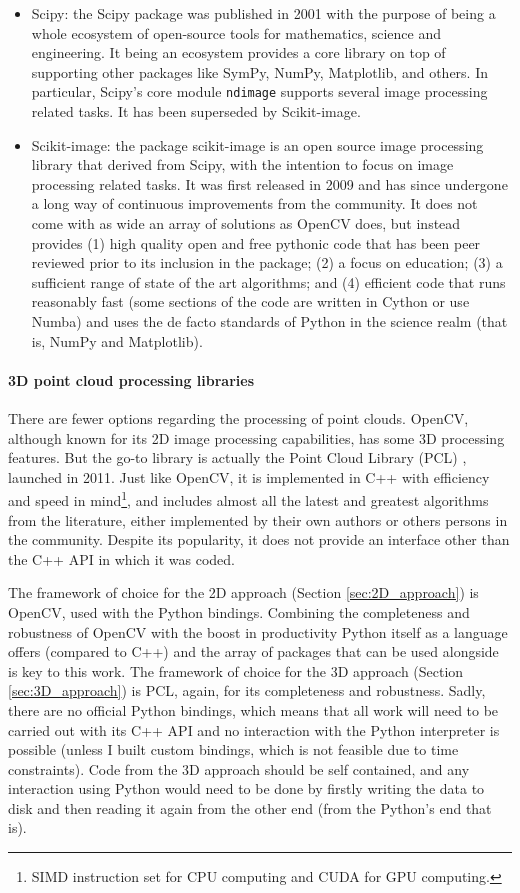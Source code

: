 \documentclass[../main.tex]{subfiles}
\begin{document}
\begin{itemize}
    \item Scipy: the Scipy package \cite{scipy_paper} was published in 2001 with the purpose of being a whole ecosystem of open-source tools for mathematics, science and engineering. It being an ecosystem provides a core library on top of supporting other packages like SymPy, NumPy, Matplotlib, and others. In particular, Scipy's core module \texttt{ndimage} supports several image processing related tasks. It has been superseded by Scikit-image.
    \item Scikit-image: the package scikit-image \cite{skimage_paper} is an open source image processing library that derived from Scipy, with the intention to focus on image processing related tasks. It was first released in 2009 and has since undergone a long way of continuous improvements from the community. It does not come with as wide an array of solutions as OpenCV does, but instead provides (1) high quality open and free pythonic code that has been peer reviewed prior to its inclusion in the package; (2) a focus on education; (3) a sufficient range of state of the art algorithms; and (4) efficient code that runs reasonably fast (some sections of the code are written in Cython or use Numba) and uses the de facto standards of Python in the science realm (that is, NumPy and Matplotlib).
\end{itemize}

\paragraph{3D point cloud processing libraries}
There are fewer options regarding the processing of point clouds. OpenCV, although known for its 2D image processing capabilities, has some 3D processing features. But the go-to library is actually the Point Cloud Library (PCL) \cite{pcl_paper}, launched in 2011. Just like OpenCV, it is implemented in C++ with efficiency and speed in mind\footnote{SIMD instruction set for CPU computing and CUDA for GPU computing.}, and includes almost all the latest and greatest algorithms from the literature, either implemented by their own authors or others persons in the community. Despite its popularity, it does not provide an interface other than the C++ API in which it was coded.

The framework of choice for the 2D approach (Section \ref{sec:2D_approach}) is OpenCV, used with the Python bindings. Combining the completeness and robustness of OpenCV with the boost in productivity Python itself as a language offers (compared to C++) and the array of packages that can be used alongside is key to this work. The framework of choice for the 3D approach (Section \ref{sec:3D_approach}) is PCL, again, for its completeness and robustness. Sadly, there are no official Python bindings, which means that all work will need to be carried out with its C++ API and no interaction with the Python interpreter is possible (unless I built custom bindings, which is not feasible due to time constraints). Code from the 3D approach should be self contained, and any interaction using Python would need to be done by firstly writing the data to disk and then reading it again from the other end (from the Python's end that is).
\end{document}
